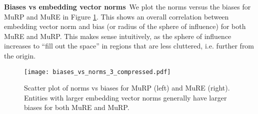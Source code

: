 \documentclass{article}
\newcommand{\keypoint}[1]{\vspace{0.cm}\noindent\textbf{#1}\,}
\begin{document}
\begin{table}[!htbp]
	\centering
	\vspace{-0.2cm}
	 \caption{Comparison of hits@10 per relation for MuRE and MuRP on WN18RR for .}
	 \vspace{0.3cm}
   
     \label{table:perrel}
 \end{table}
 
\keypoint{Biases vs embedding vector norms} We plot the norms versus the biases  for MuRP and MuRE in Figure \ref{fig:biasvsnorm}. This shows an overall correlation between embedding vector norm and bias (or radius of the sphere of influence) for both MuRE and MuRP. This makes sense intuitively, as the sphere of influence increases to ``fill out the space'' in regions that are less cluttered, i.e. further from the origin.

\begin{figure}[!htbp]
\centering
\texttt{[image: biases\_vs\_norms\_3\_compressed.pdf]}
\caption{Scatter plot of norms vs biases for MuRP (left) and MuRE (right). Entities with larger embedding vector norms generally have larger biases for both MuRE and MuRP.}
\label{fig:biasvsnorm}
\end{figure}
 
\end{document}
